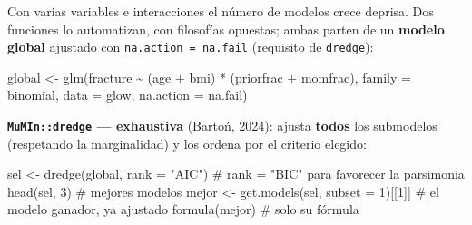 \documentclass[
  letterpaper,
  DIV=11,
  numbers=noendperiod]{scrartcl}
\newenvironment{Shaded}{\begin{snugshade}}{\end{snugshade}}
\newcommand{\AttributeTok}[1]{\textcolor[rgb]{0.40,0.45,0.13}{#1}}
\newcommand{\CommentTok}[1]{\textcolor[rgb]{0.37,0.37,0.37}{#1}}
\newcommand{\DecValTok}[1]{\textcolor[rgb]{0.68,0.00,0.00}{#1}}
\newcommand{\FunctionTok}[1]{\textcolor[rgb]{0.28,0.35,0.67}{#1}}
\newcommand{\NormalTok}[1]{\textcolor[rgb]{0.00,0.23,0.31}{#1}}
\newcommand{\OtherTok}[1]{\textcolor[rgb]{0.00,0.23,0.31}{#1}}
\newcommand{\SpecialCharTok}[1]{\textcolor[rgb]{0.37,0.37,0.37}{#1}}
\newcommand{\StringTok}[1]{\textcolor[rgb]{0.13,0.47,0.30}{#1}}
\begin{document}
\begin{tcolorbox}[enhanced jigsaw, breakable, colframe=quarto-callout-tip-color-frame, left=2mm, arc=.35mm, colbacktitle=quarto-callout-tip-color!10!white, toprule=.15mm, colback=white, coltitle=black, rightrule=.15mm, opacitybacktitle=0.6, title=\textcolor{quarto-callout-tip-color}{\faLightbulb}\hspace{0.5em}{🔧 En R. Automatizar la escalera: \texttt{dredge} (exhaustiva) y
\texttt{stepAIC} (paso a paso)}, titlerule=0mm, toptitle=1mm, bottomtitle=1mm, leftrule=.75mm, bottomrule=.15mm, opacityback=0]

Con varias variables e interacciones el número de modelos crece deprisa.
Dos funciones lo automatizan, con filosofías opuestas; ambas parten de
un \textbf{modelo global} ajustado con \texttt{na.action\ =\ na.fail}
(requisito de \texttt{dredge}):

\begin{Shaded}
\begin{Highlighting}[]
\NormalTok{global }\OtherTok{\textless{}{-}} \FunctionTok{glm}\NormalTok{(fracture }\SpecialCharTok{\textasciitilde{}}\NormalTok{ (age }\SpecialCharTok{+}\NormalTok{ bmi) }\SpecialCharTok{*}\NormalTok{ (priorfrac }\SpecialCharTok{+}\NormalTok{ momfrac),}
              \AttributeTok{family =}\NormalTok{ binomial, }\AttributeTok{data =}\NormalTok{ glow, }\AttributeTok{na.action =}\NormalTok{ na.fail)}
\end{Highlighting}
\end{Shaded}

\textbf{\texttt{MuMIn::dredge} --- exhaustiva} (Bartoń, 2024): ajusta
\textbf{todos} los submodelos (respetando la marginalidad) y los ordena
por el criterio elegido:

\begin{Shaded}
\begin{Highlighting}[]
\NormalTok{sel   }\OtherTok{\textless{}{-}} \FunctionTok{dredge}\NormalTok{(global, }\AttributeTok{rank =} \StringTok{"AIC"}\NormalTok{)        }\CommentTok{\# rank = "BIC" para favorecer la parsimonia}
\FunctionTok{head}\NormalTok{(sel, }\DecValTok{3}\NormalTok{)                                 }\CommentTok{\# mejores modelos}
\NormalTok{mejor }\OtherTok{\textless{}{-}} \FunctionTok{get.models}\NormalTok{(sel, }\AttributeTok{subset =} \DecValTok{1}\NormalTok{)[[}\DecValTok{1}\NormalTok{]]    }\CommentTok{\# el modelo ganador, ya ajustado}
\FunctionTok{formula}\NormalTok{(mejor)                               }\CommentTok{\# solo su fórmula}
\end{Highlighting}
\end{Shaded}


\end{tcolorbox}
\end{document}
